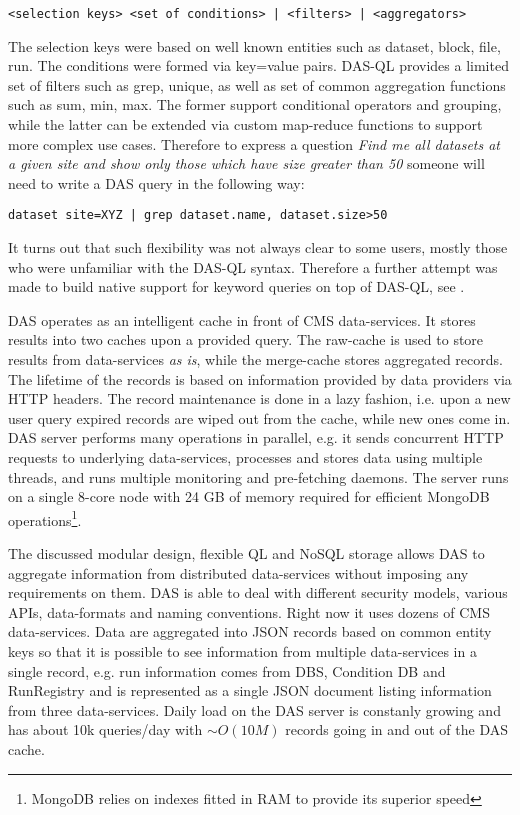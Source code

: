 \begin{verbatim}
<selection keys> <set of conditions> | <filters> | <aggregators>
\end{verbatim}

The selection keys were based on well known entities such as dataset, block, file,
run. The conditions were formed via key=value pairs. DAS-QL
provides a limited set of filters such as grep, unique,
as well as set of common aggregation functions such as
sum, min, max. The former support conditional operators and grouping, while
the latter can be extended via custom map-reduce functions to support more complex
use cases. Therefore to express a question {\it Find me all datasets at a
given site and show only those which have size greater than 50} someone will need to
write a DAS query in the following way:

\begin{verbatim}
dataset site=XYZ | grep dataset.name, dataset.size>50
\end{verbatim}

It turns out that such flexibility was not always clear to some users,
mostly those who were unfamiliar with the DAS-QL syntax. Therefore a further
attempt was made to build native support for keyword queries on top of DAS-QL,
see \cite{DASKWS}.

DAS operates as an intelligent cache in front of CMS data-services. It stores
results into two caches upon a provided query. The raw-cache is used to store results from
data-services {\it as is}, while the merge-cache stores aggregated
records. The lifetime of the records is based on information provided by
data providers via HTTP headers. The record maintenance is done in a lazy
fashion, i.e. upon a new user query expired records are wiped out from the cache,
while new ones come in. DAS server performs many operations in parallel, e.g.
it sends concurrent HTTP requests to underlying data-services, processes and
stores
data using multiple threads, and runs multiple monitoring and pre-fetching
daemons. The server runs on a single 8-core node with 24 GB of memory
required for efficient MongoDB operations\footnote{MongoDB relies on indexes
fitted in RAM to provide its superior speed}.

The discussed modular design, flexible QL and NoSQL storage allows DAS to
aggregate information from distributed data-services without imposing any
requirements on them. DAS is able to deal with different security models,
various APIs, data-formats and naming conventions. Right now it uses dozens of CMS
data-services. Data are aggregated into JSON records based on common entity
keys so that it is possible to see information from multiple
data-services in a single record, e.g. run information comes from DBS, Condition DB and
RunRegistry and is represented as a single JSON document listing information from
three data-services. Daily load on the DAS server is constanly growing and has about 10k
queries/day with $\sim O(10M)$ records going in and out of the DAS cache.

